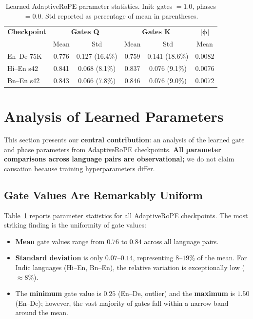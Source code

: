 \documentclass[conference]{IEEEtran}
\begin{document}
\begin{table}[t]
  \centering
  \small
  \caption{Learned AdaptiveRoPE parameter statistics.
  Init: gates $=1.0$, phases $=0.0$.
  Std reported as percentage of mean in parentheses.
  \label{tab:params}}
  \begin{tabular}{lccccc}
    \toprule
    \textbf{Checkpoint} & \multicolumn{2}{c}{\textbf{Gates Q}} & \multicolumn{2}{c}{\textbf{Gates K}} & $|\boldsymbol{\phi}|$ \\
    & Mean & Std & Mean & Std & Mean \\
    \midrule
    En--De 75K & 0.776 & 0.127 (16.4\%) & 0.759 & 0.141 (18.6\%) & 0.0082 \\
    Hi--En s42 & 0.841 & 0.068 (8.1\%) & 0.837 & 0.076 (9.1\%) & 0.0076 \\
    Bn--En s42 & 0.843 & 0.066 (7.8\%) & 0.846 & 0.076 (9.0\%) & 0.0072 \\
    \bottomrule
  \end{tabular}
\end{table}


\section{Analysis of Learned Parameters}
\label{sec:params}

This section presents our \textbf{central contribution}: an analysis of
the learned gate and phase parameters from AdaptiveRoPE checkpoints.
\textbf{All parameter comparisons across language pairs are observational;}
we do not claim causation because training hyperparameters differ.

\subsection{Gate Values Are Remarkably Uniform}

Table~\ref{tab:params} reports parameter statistics for all AdaptiveRoPE
checkpoints. The most striking finding is the uniformity of gate values:

\begin{itemize}
  \item \textbf{Mean} gate values range from $0.76$ to $0.84$ across all
        language pairs.
  \item \textbf{Standard deviation} is only $0.07$--$0.14$, representing
        $8$--$19\%$ of the mean. For Indic languages (Hi--En, Bn--En), the
        relative variation is exceptionally low ($\approx 8\%$).
  \item The \textbf{minimum} gate value is $0.25$ (En--De, outlier) and the
        \textbf{maximum} is $1.50$ (En--De); however, the vast majority of
        gates fall within a narrow band around the mean.
\end{itemize}
\end{document}
